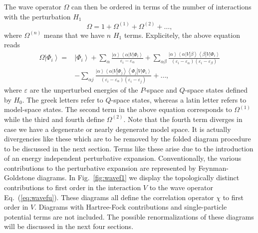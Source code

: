 \documentclass{article}
\begin{document}
The wave operator $\Omega$ can then be ordered in terms of the number
of interactions with the perturbation $H_1$
\begin{equation}
              \Omega = 1 +\Omega^{(1)} + \Omega^{(2)}+\dots ,
\end{equation}
where $\Omega^{(n)}$ means that we have $n$ $H_1$ terms.
Explicitely, the above
equation reads
\begin{eqnarray}
         \Omega\left|\Phi_i\right\rangle=
         &{\displaystyle\left|\Phi_i\right\rangle
         +\sum_{\alpha}\frac{\left|\alpha\right\rangle
         \left\langle\alpha\right|
          V\left|\Phi_i\right\rangle}{\varepsilon_i -\varepsilon_{\alpha}}
         +\sum_{\alpha\beta}\frac{\left|\alpha\right\rangle
        \left\langle\alpha\right| V
         \left|\beta\right\rangle\left\langle\beta\right| V
         \left|\Phi_i\right\rangle }
         {(\varepsilon_i-\varepsilon_{\alpha})
       (\varepsilon_i-\varepsilon_{\beta})} }\\   \label{eq:wavefu}\nonumber
&       {\displaystyle  -\sum_{\alpha j}\frac{\left|\alpha\right\rangle
       \left\langle\alpha\right|
         V\left|\Phi_j\right\rangle
        \left\langle\Phi_j\right| V\left|\Phi_i\right\rangle}
       {(\varepsilon_i-\varepsilon_{\alpha})
      (\varepsilon_i-\varepsilon_{j})} }
       +\dots ,
\end{eqnarray}
where $\varepsilon$ are the unperturbed energies of the $P$-space
and $Q$-space states defined by $H_0$.
The greek letters refer to
$Q$-space states, whereas a latin letter refers to model-space
states.   The second term
in the above equation corresponds to $\Omega^{(1)}$ while the third
and fourth define $\Omega^{(2)}$.
Note that the fourth term diverges
in case we have a degenerate or nearly degenerate model space. It is
actually divergencies like these which are to be removed by the folded
diagram procedure to be discussed in the next section. Terms like these
arise due to the introduction of an energy independent perturbative
expansion. Conventionally, the various contributions to the
perturbative expansion are represented by Feynman-Goldstone diagrams.
In Fig.\ \ref{fig:wavef1} we display the topologically distinct
contributions to first order in the
interaction $V$ to
the wave operator Eq.\ (\ref{eq:wavefu}). These diagrams all
define the correlation operator $\chi$ to first order in $V$.
Diagrams with Hartree-Fock contributions
and single-particle potential terms
are not included. The possible
renormalizations of these diagrams will be discussed
in the next four sections.
\end{document}
